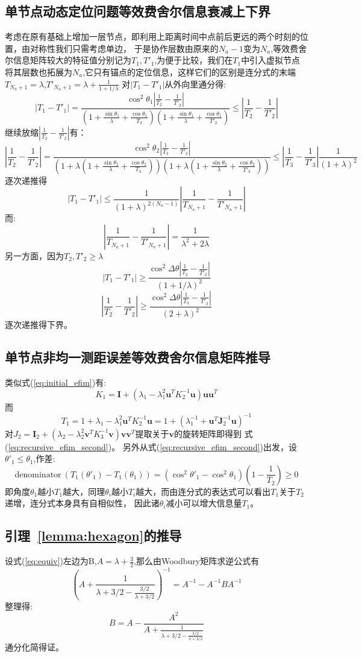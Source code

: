 \subsection{单节点动态定位问题等效费舍尔信息衰减上下界}\label{B_F_2}
考虑在原有基础上增加一层节点，即利用上距离时间中点前后更远的两个时刻的位置，由对称性我们只需考虑单边，
于是协作层数由原来的$N_a-1$变为$N_a$,等效费舍尔信息矩阵较大的特征值分别记为$T_1,T'_1$,为便于比较，我们在$T_1$中引入虚拟节点将其层数也拓展为$N_a$,它只有锚点的定位信息，这样它们的区别是连分式的末端$T_{N_a+1}=\lambda$,$T'_{N_a+1}=\lambda+\frac{1}{1+1/\lambda}$
对$|T_1-T'_1|$从外向里通分得:
\[
|T_1-T'_1|=\frac{\cos^2\theta_1|\frac{1}{T_2}-\frac{1}{T'_2}|}{(1+\frac{\sin\theta_1}{\lambda}+\frac{\cos\theta_1}{T_2})
(1+\frac{\sin\theta_1}{\lambda}+\frac{\cos\theta_1}{T'_2})}\leq |\frac{1}{T_2}-\frac{1}{T'_2}|
\]
继续放缩$|\frac{1}{T_2}-\frac{1}{T'_2}|$有：
\[
|\frac{1}{T_2}-\frac{1}{T'_2}|= \frac{\cos^2\theta_2|\frac{1}{T_3}-\frac{1}{T'_3}|}{(1+\lambda(1+\frac{\sin\theta_2}{\lambda}+\frac{\cos\theta_2}{T_3}))
(1+\lambda(1+\frac{\sin\theta_2}{\lambda}+\frac{\cos\theta_2}{T'_3}))}\leq |\frac{1}{T_3}-\frac{1}{T'_3}|\frac{1}{(1+\lambda)^2}
\]
逐次递推得
\[
|T_1-T'_1|\leq \frac{1}{(1+\lambda)^{2(N_a-1)}} |\frac{1}{T_{N_a+1}}-\frac{1}{T'_{N_a+1}}|
\]
而:
\[
|\frac{1}{T_{N_a+1}}-\frac{1}{T'_{N_a+1}}|=\frac{1}{\lambda^2+2\lambda}
\]
另一方面，因为$T_2,T'_2\geq \lambda$
\[
|T_1-T'_1|\geq \frac{\cos^2\Delta\theta|\frac{1}{T_2}-\frac{1}{T'_2}|}{(1+1/\lambda)^2}
\]
\[
|\frac{1}{T_2}-\frac{1}{T'_2}|\geq \frac{\cos^2\Delta\theta|\frac{1}{T_3}-\frac{1}{T'_3}|}{(2+\lambda)^2}
\]
逐次递推得下界。
\subsection{单节点非均一测距误差等效费舍尔信息矩阵推导}\label{B_F_3}
类似式(\ref{eq:initial_efim})有:
\[
K_1=\bm{I}+(\lambda_1-\lambda_1^2 \bm{u}^T K_2^{-1}\bm{u})\bm{u}\bm{u}^T
\]
而
\[
T_1=1+\lambda_1-\lambda_1^2 \bm{u}^T K_2^{-1}\bm{u}=1+(\lambda_1^{-1}+\bm{u}^T\bm{J}_2^{-1}\bm{u})^{-1}
\]
对$J_2=\bm{I}_2+(\lambda_2-\lambda_2^2\bm{v}^T K_3^{-1}\bm{v})\bm{v}\bm{v}^T$提取关于$\bm{v}$的旋转矩阵即得到
式(\ref{eq:recursive_efim_second})。
另外从式(\ref{eq:recursive_efim_second})出发，设$\theta'_1\leq \theta_1$,作差:
\[
\text{denominator}~(T_1(\theta'_1)-T_1(\theta_1))=(\cos^2\theta'_1-\cos^2\theta_1)(1-\frac{1}{T_2})\geq 0
\]
即角度$\theta_1$越小$T_1$越大，同理$\theta_i$越小$T_i$越大，而由连分式的表达式可以看出$T_1$关于$T_2$递增，连分式本身具有自相似性，
因此诸$\theta_i$减小可以增大信息量$T_1$。
\subsection{引理~\ref{lemma:hexagon}的推导}\label{B_F_4}
  设式(\ref{eq:equiv})左边为B,$A=\lambda+\frac{3}{2}$,那么由Woodbury矩阵求逆公式有
  \[
  (A+\frac{1}{\lambda+3/2-\frac{3/2}{\lambda+3/2}})^{-1}=A^{-1}-A^{-1}BA^{-1}
  \]
  整理得:
  \[
  B=A-\frac{A^2}{A+\frac{1}{\lambda+3/2-\frac{3/2}{\lambda+3/2}}}
  \]
  通分化简得证。

